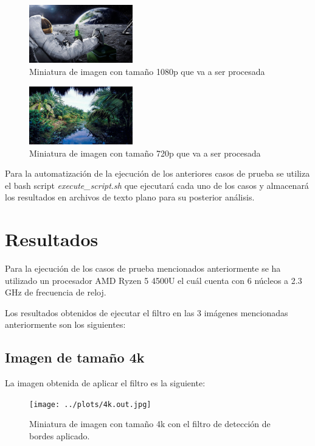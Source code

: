 \begin{figure}[H]
    \centering
    \includegraphics[width=0.4\textwidth]{../plots/1080p.jpg}
    \caption{Miniatura de imagen con tamaño 1080p que va a ser procesada}
\end{figure}

\begin{figure}[H]
    \centering
    \includegraphics[width=0.4\textwidth]{../plots/720p.jpg}
    \caption{Miniatura de imagen con tamaño 720p que va a ser procesada}
\end{figure}

Para la automatización de la ejecución de los anteriores casos de prueba se utiliza el bash script \textit{execute\_script.sh} que ejecutará cada uno de los casos y almacenará los resultados en archivos de texto plano para su posterior análisis.

\section{Resultados}

Para la ejecución de los casos de prueba mencionados anteriormente se ha utilizado un procesador AMD Ryzen 5 4500U el cuál cuenta con 6 núcleos a 2.3 GHz de frecuencia de reloj.

Los resultados obtenidos de ejecutar el filtro en las 3 imágenes mencionadas anteriormente son los siguientes:

\subsection{Imagen de tamaño 4k}

La imagen obtenida de aplicar el filtro es la siguiente:

\begin{figure}[H]
    \centering
    \texttt{[image: ../plots/4k.out.jpg]}
    \caption{Miniatura de imagen con tamaño 4k con el filtro de detección de bordes aplicado.}
\end{figure}


